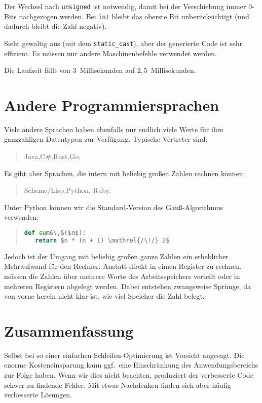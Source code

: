 \documentclass[a5paper,landscape,ngerman,10pt]{article}
\begin{document}
Der Wechsel nach \lstinline!unsigned! ist notwendig, damit
bei der Verschiebung immer $0$-Bits nachgezogen werden.
Bei \lstinline!int! bleibt das oberste Bit unberücksichtigt
(und dadurch bleibt die Zahl negativ).

Sieht gewaltig aus (mit dem \lstinline!static_cast!), aber
der generierte Code ist sehr effizient.
Es müssen nur andere Maschinenbefehle verwendet werden.

Die Laufzeit fällt von 3~Millisekunden auf $2{,}5$~Millisekunden.

\section{Andere Programmiersprachen}

Viele andere Sprachen haben ebenfalls nur endlich viele Werte für ihre
ganzzahligen Datentypen zur Verfügung.
Typische Vertreter sind:

\begin{quotation}
 Java,\qquad C\#,\qquad Rust,\qquad Go.
\end{quotation}

Es gibt aber Sprachen, die intern mit beliebig großen
Zahlen rechnen können:

\begin{quotation}
 Scheme/Lisp,\qquad Python, \qquad Ruby.
\end{quotation}

Unter Python können wir die Standard-Version des Gauß-Algorithmus verwenden:

\begin{quotation}
\begin{lstlisting}[language=Python]
def sum&\,&($n$):
   return $n * (n + 1) \mathrel{/\!/} 2$
\end{lstlisting}
\end{quotation}

Jedoch ist der Umgang mit beliebig großen ganze Zahlen
ein erheblicher Mehraufwand für den Rechner.
Anstatt direkt in eimen Register zu rechnen, müssen die
Zahlen über mehrere Worte des Arbeitsspeichers verteilt
oder in mehreren Registern abgelegt werden.
Dabei entstehen zwangsweise Sprünge, da von vorne herein
nicht klar ist, wie viel Speicher die Zahl belegt.

\section{Zusammenfassung}

Selbst bei so einer einfachen Schleifen-Optimierung ist
Vorsicht angesagt.
Die enorme Kosteneinsparung kann ggf.\ eine Einschränkung
des Anwendungsbereichs zur Folge haben.
Wenn wir dies nicht beachten, produziert der verbesserte
Code schwer zu findende Fehler.
Mit etwas Nachdenken finden sich aber häufig verbesserte
Lösungen.
\end{document}
